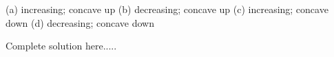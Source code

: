 \begin{example}
\begin{table}[H]
\begin{center}
\begin{multicols}{4}
 \end{multicols}   
    \caption{}
    \label{table:ConavityTable}
    \end{center}
\end{table}

    
    \begin{sol}
    (a) increasing; concave up (b) decreasing; concave up (c) increasing; concave down (d) decreasing; concave down

    \end{sol}
    \begin{solL}
    Complete solution here.....
    \end{solL}
\end{example}
\vspace{-0.5in}



